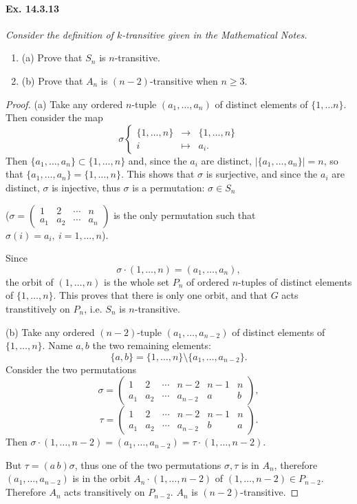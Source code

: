 \documentclass[11pt,a4paper]{article}
\newcommand{\be} {\begin{enumerate}}
\newcommand{\ee} {\end{enumerate}}
\begin{document}
  \paragraph{Ex. 14.3.13}{\it Consider the definition of $k$-transitive given in the Mathematical Notes.
  \be
  \item[(a)] Prove that $S_n$ is $n$-transitive.
  \item[(b)] Prove that $A_n$ is $(n-2)$-transitive when $n\geq 3$.
  \ee
  }
  \begin{proof}
 \item[(a)] Take any ordered $n$-tuple $(a_1,\ldots,a_n)$ of distinct elements of $\{1,\ldots n\}$. Then consider the map 
  $$
  \sigma
  \left\{
  \begin{array}{ccc}
  \{1,\ldots,n\} & \to &\{1,\ldots,n\}\\
  i &\mapsto &a_i.
  \end{array}
  \right.
  $$
  Then $\{a_1,\ldots,a_n\} \subset \{1,\ldots,n\}$ and, since the $a_i$ are distinct, $|\{a_1,\ldots,a_n\}| = n$, so that $\{a_1,\ldots,a_n\} = \{1,\ldots,n\}$. This shows that $\sigma$ is surjective, and since the $a_i$ are distinct, $\sigma$ is injective, thus $\sigma$ is a permutation: $\sigma \in S_n$
  
   ($\sigma =
   \left(
   \begin{array}{cccc}
   1&2&\cdots&n\\
   a_1&a_2&\cdots&a_n
   \end{array}
   \right)
   $ is the only permutation such that $\sigma(i) = a_i,\ i=1,\ldots,n$).
 
 Since 
$$\sigma\cdot(1,\ldots,n) = (a_1,\ldots,a_n),$$
the orbit of $(1,\ldots,n)$ is the whole set $P_n$ of ordered $n$-tuples of distinct elements of $\{1,\ldots,n\}$. This proves that there is only one orbit, and that $G$ acts transtitively on $P_n$, i.e. $S_n$ is $n$-transitive.

\item[(b)] Take any ordered $(n-2)$-tuple $(a_1,\ldots,a_{n-2})$ of distinct elements of $\{1,\ldots,n\}$. Name $a,b$ the two remaining elements:
$$\{a,b\} = \{1,\ldots,n\} \setminus \{a_1,\ldots,a_{n-2}\}.$$
Consider the two permutations
$$
\sigma =
   \left(
   \begin{array}{cccccc}
   1&2&\cdots&n-2 & n-1&n\\
   a_1&a_2&\cdots&a_{n-2}& a & b
   \end{array}
   \right),
 $$
 $$
\tau =
   \left(
   \begin{array}{cccccc}
   1&2&\cdots&n-2 & n-1&n\\
   a_1&a_2&\cdots&a_{n-2}& b & a
   \end{array}
   \right).
 $$
 Then $\sigma\cdot (1,\ldots,n-2) = (a_1,\ldots,a_{n-2}) = \tau\cdot (1,\ldots,n-2)$.
 
But $\tau = (a\, b) \sigma$, thus one of the two permutations $\sigma, \tau$ is in $A_n$, therefore $(a_1,\ldots,a_{n-2}) $ is in the orbit $A_n\cdot (1,\ldots,n-2)$ of $(1,\ldots,n-2) \in P_{n-2}$. Therefore $A_n$ acts transitively on $P_{n-2}$. $A_n$ is $(n-2)$-transitive.
  \end{proof}
 
\end{document}
